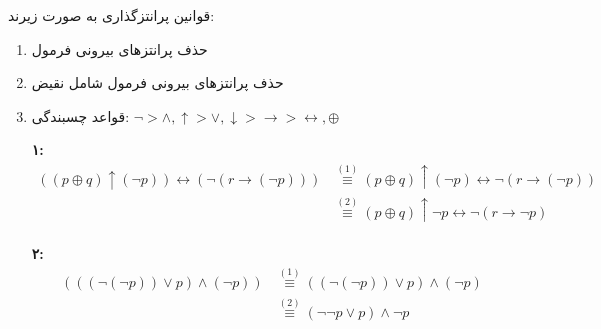 \documentclass[]{exam}
\begin{document}
قوانین پرانتزگذاری به صورت زیرند:
\begin{enumerate}
    \item حذف پرانتزهای بیرونی فرمول
    \item حذف پرانتزهای بیرونی فرمول شامل نقیض
    \item قواعد چسبندگی: $\mathbf{\neg} > \mathbf{\land, \uparrow} > \mathbf{\lor, \downarrow} > \mathbf{\rightarrow} > \mathbf{\leftrightarrow, \oplus}$


\vspace{1cm}
\textbf{۱:}
\begin{align*}
    ((p \oplus q) \uparrow (\neg p)) \leftrightarrow (\neg (r \rightarrow (\neg p))) 
    &\stackrel{(1)}{\equiv} (p \oplus q) \uparrow (\neg p) \leftrightarrow \neg (r \rightarrow (\neg p))\\
    &\stackrel{(2)}{\equiv} (p \oplus q) \uparrow \neg p \leftrightarrow \neg (r \rightarrow \neg p)\\
\end{align*}


\textbf{۲:}
\begin{align*}
    (((\neg (\neg p)) \lor p) \land (\neg p))
    &\stackrel{(1)}{\equiv} ((\neg (\neg p)) \lor p) \land (\neg p)\\
    &\stackrel{(2)}{\equiv} (\neg \neg p \lor p) \land \neg p\\
\end{align*}

\end{enumerate}
\end{document}

